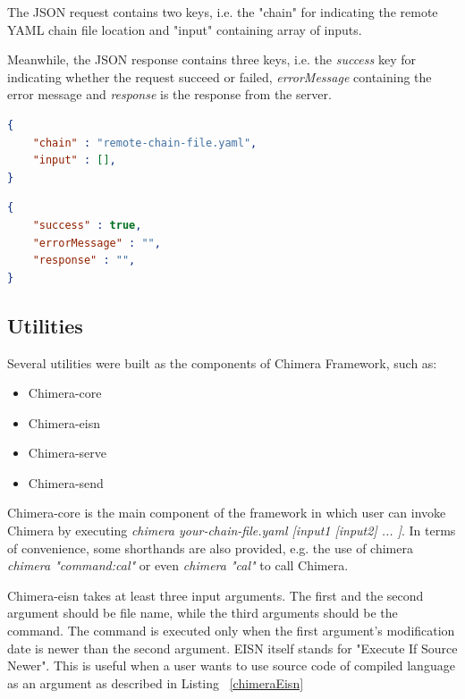 \documentclass[conference]{IEEEtran}
\begin{document}
The JSON request contains two keys, i.e. the "chain" for 
indicating the remote YAML chain file location and "input" containing array of inputs.

Meanwhile, the JSON response contains three keys, i.e. the {\it success} key for indicating
whether the request succeed or failed, {\it errorMessage} containing the error message and
{\it response} is the response from the server.

\begin{lstlisting}[caption=JSON Request, label=jsonRequest, language=json, basicstyle=\small, breaklines=true] 
{
    "chain" : "remote-chain-file.yaml",
    "input" : [],
}
\end{lstlisting}

\begin{lstlisting}[caption=JSON Response, label=jsonResponse, language=json, basicstyle=\small, breaklines=true]
{
    "success" : true,
    "errorMessage" : "",
    "response" : "",
}
\end{lstlisting}


\subsection{Utilities}

Several utilities were built as the components of Chimera Framework, such as:

\begin{itemize}
    \item Chimera-core
    \item Chimera-eisn
    \item Chimera-serve
    \item Chimera-send
\end{itemize}

Chimera-core is the main component of the framework in which user can invoke Chimera by
executing {\it chimera your-chain-file.yaml [input1 [input2] ... ]}. In terms of convenience,
some shorthands are also provided, e.g. the use of chimera 
{\it chimera "command:cal"} or even {\it chimera "cal"} to call Chimera.

Chimera-eisn takes at least three input arguments. The first and the second argument should
be file name, while the third arguments should be the command. The command is 
executed only when the first argument's modification date is newer than the second 
argument. EISN itself stands for "Execute If Source Newer". This is useful when a user
wants to use source code of compiled language as an argument as described in Listing ~\ref{chimeraEisn}
\end{document}
